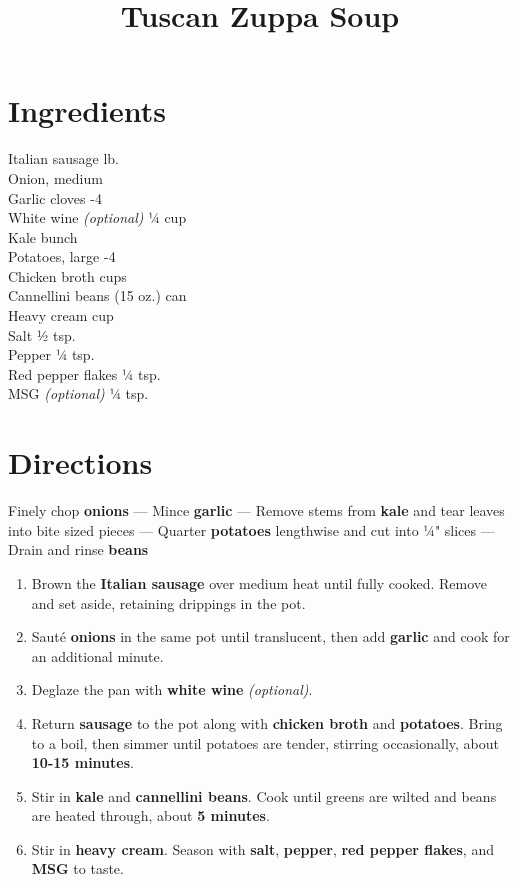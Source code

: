 \documentclass[11pt,letterpaper]{article}
\title{Tuscan Zuppa Soup}
\author{}
\date{}
\begin{document}
\maketitle
\thispagestyle{empty}

\section*{Ingredients}
\setlength{\columnsep}{20pt}
\begin{multicols}{2}
\noindent
    Italian sausage  lb. \\
    Onion, medium  \\
    Garlic cloves -4 \\
    White wine \textit{(optional)} \dotfill ¼ cup \\
    Kale  bunch \\
    Potatoes, large -4 \\
    \columnbreak
    Chicken broth  cups \\
    Cannellini beans  (15 oz.) can \\
    Heavy cream  cup \\
    Salt \dotfill ½ tsp.\\
    Pepper \dotfill ¼ tsp. \\
	Red pepper flakes \dotfill ¼ tsp. \\
    MSG \textit{(optional)} \dotfill ¼ tsp.
\end{multicols}

\section*{Directions}

\noindent
Finely chop \textbf{onions} ---
Mince \textbf{garlic} ---
Remove stems from \textbf{kale} and tear leaves into bite sized pieces ---
Quarter \textbf{potatoes} lengthwise and cut into ¼" slices ---
Drain and rinse \textbf{beans}

\begin{enumerate}
    \item Brown the \textbf{Italian sausage} over medium heat until fully cooked. Remove and set aside, retaining drippings in the pot.
    \item Sauté \textbf{onions} in the same pot until translucent, then add \textbf{garlic} and cook for an additional minute.
    \item Deglaze the pan with \textbf{white wine} \textit{(optional)}.
    \item Return \textbf{sausage} to the pot along with \textbf{chicken broth} and \textbf{potatoes}. Bring to a boil, then simmer until potatoes are tender, stirring occasionally, about \textbf{10-15 minutes}.
    \item Stir in \textbf{kale} and \textbf{cannellini beans}. Cook until greens are wilted and beans are heated through, about \textbf{5 minutes}.
    \item Stir in \textbf{heavy cream}. Season with \textbf{salt}, \textbf{pepper}, \textbf{red pepper flakes}, and \textbf{MSG} to taste.
\end{enumerate}
\end{document}
